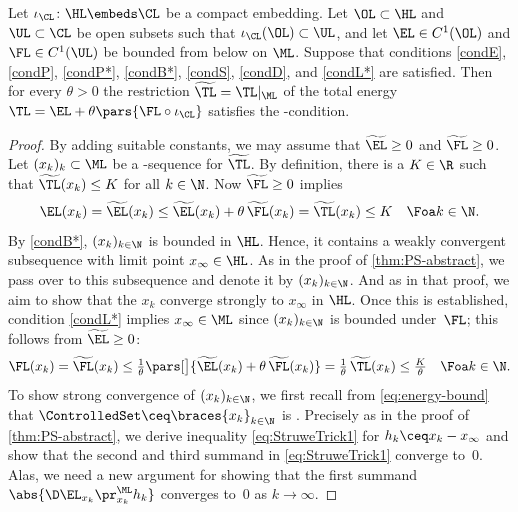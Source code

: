 \begin{corollary}[(PS)-condition for the total energy $\widetilde{\TL}=\TL|_\ML$]
\label{cor:PS-total-energy}
	Let $\iota_\CL \colon \HL \embeds \CL$ be a compact embedding.
	Let $\OL \subset \HL$ and $\UL \subset \CL$ be open subsets such that $\iota_\CL(\OL) \subset \UL$, and let $\EL \in C^1(\OL)$ and $\FL \in C^1(\UL)$ be bounded from below on $\ML$.
	Suppose that conditions \ref{condE},
	\ref{condP}, \ref{condP*},
	\ref{condB*}, \ref{condS}, \ref{condD},
	and \ref{condL*} are satisfied.
	Then for every $\theta>0$ the restriction  $\widetilde{\TL}=\TL|_\ML$ of the total energy $\TL = \EL + \theta \pars{\FL\circ\iota_\CL}$
	satisfies the \PaSma-condition.
\end{corollary}

\begin{proof}
	By adding suitable constants, we may assume that $\widetilde{\EL} \geq 0$ and $\widetilde{\FL} \geq 0$.
	Let $(x_k)_k\subset\ML$ be a \PaSma-sequence for $\widetilde{\TL}$.
	By definition, there is a $K \in \R$ such that $\widetilde{\TL}(x_k) \leq K$ for all $k \in \N$.
	Now $\widetilde{\FL} \geq 0$ implies
	\begin{equation}
		\label{eq:energy-bound}
		\EL(x_k)
		=
		\widetilde{\EL}(x_k)
		\le
		\widetilde{\EL}(x_k) + \theta \, \widetilde{\FL}(x_k)=\widetilde{\TL}(x_k)\le K\quad\Foa k\in\N
		.
	\end{equation}
	By \ref{condB*}, $(x_k)_{k \in \N}$ is bounded in $\HL$. Hence, it contains a weakly convergent subsequence with limit point $x_\infty \in \HL$. 
	As in the proof of \cref{thm:PS-abstract}, we pass over to this subsequence and denote it by $(x_k)_{k \in \N}$. 
	And as in that proof, we aim to show that the $x_k$ converge strongly to $x_\infty$ in $\HL$.
	Once this is established, condition \ref{condL*} implies $x_\infty \in \ML$
	since $(x_{k})_{k \in \N}$ is bounded under~$\FL$;
	this follows from $\widetilde{\EL} \geq 0$:
	\begin{equation*}
		\FL(x_k)
		=
		\widetilde{\FL}(x_k)
		\le
		\tfrac{1}{\theta}
		\pars[\big]{ \widetilde{\EL}(x_k) + \theta \, \widetilde{\FL}(x_k)}
		=
		\tfrac{1}{\theta} \, \widetilde{\TL}(x_k)
		\le 
		\tfrac{K}{\theta}
		\quad\Foa k\in\N.
	\end{equation*}
	To show strong convergence of $(x_k)_{k \in \N}$, we first recall from \cref{eq:energy-bound} that $\ControlledSet \ceq \braces{x_k}_{k \in \N}$  is \Econtrolled{\EL}.
	Precisely as in the proof of \cref{thm:PS-abstract}, we derive inequality \cref{eq:StruweTrick1} for $h_k \ceq x_k - x_\infty$ and show that the second and third summand in \cref{eq:StruweTrick1} converge to~$0$. Alas, we need a new argument for showing that the first summand $\abs{\D \EL_{x_k} \pr^\ML_{x_k} h_k}$ converges to~$0$ as $ k\to \infty $.

\end{proof}
